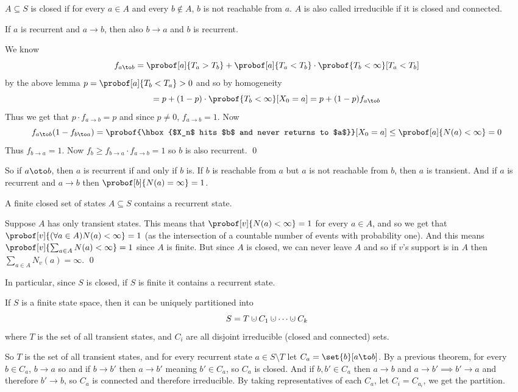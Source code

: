     $A\subseteq S$ is {\emphcolor closed} if for every $a\in A$ and every $b\notin A$, $b$ is not reachable from $a$.
    $A$ is also called {\emphcolor irreducible} if it is closed and connected.

\edefn

\bthrm

    If $a$ is recurrent and $a\to b$, then also $b\to a$ and $b$ is recurrent.

\ethrm

We know
$$ f_{a\to b} = \probof[a]{T_a>T_b} + \probof[a]{T_a<T_b}\cdot\probof{T_b<\infty}[T_a<T_b] $$
by the above lemma $p=\probof[a]{T_b<T_a}>0$ and so by homogeneity
$$ = p + (1-p)\cdot\probof{T_b<\infty}[X_0=a] = p + (1-p)f_{a\to b} $$
Thus we get that $p\cdot f_{a\to b}=p$ and since $p\neq0$, $f_{a\to b}=1$.
Now
$$ f_{a\to b}(1-f_{b\to a}) = \probof{\hbox{$X_n$ hits $b$ and never returns to $a$}}[X_0=a] \leq \probof[a]{N(a)<\infty} = 0 $$
Thus $f_{b\to a}=1$.
Now $f_b\geq f_{b\to a}\cdot f_{a\to b}=1$ so $b$ is also recurrent.
\qed

So if $a\oto b$, then $a$ is recurrent if and only if $b$ is.
If $b$ is reachable from $a$ but $a$ is not reachable from $b$, then $a$ is transient.
And if $a$ is recurrent and $a\to b$ then $\probof[b]{N(a)=\infty}=1$.

\bthrm

    A finite closed set of states $A\subseteq S$ contains a recurrent state.

\ethrm

Suppose $A$ has only transient states.
This means that $\probof[v]{N(a)<\infty}=1$ for every $a\in A$, and so we get that $\probof[v]{(\forall a\in A)N(a)<\infty}=1$ (as the intersection of a countable number of events with probability one).
And this means $\probof[v]{\sum_{a\in A}N(a)<\infty}=1$ since $A$ is finite.
But since $A$ is closed, we can never leave $A$ and so if $v$'s support is in $A$ then $\sum_{a\in A}N_v(a)=\infty$.
\qed

In particular, since $S$ is closed, if $S$ is finite it contains a recurrent state.

\bthrm

    If $S$ is a finite state space, then it can be uniquely partitioned into
    $$ S = T\dcup C_1\dcup\cdots\dcup C_k $$
    where $T$ is the set of all transient states, and $C_i$ are all disjoint irreducible (closed and connected) sets.

\ethrm

So $T$ is the set of all transient states, and for every recurrent state $a\in S\setminus T$ let $C_a=\set{b}[a\to b]$.
By a previous theorem, for every $b\in C_a$, $b\to a$ so and if $b\to b'$ then $a\to b'$ meaning $b'\in C_a$, so $C_a$ is closed.
And if $b,b'\in C_a$ then $a\to b$ and $a\to b'\implies b'\to a$ and therefore $b'\to b$, so $C_a$ is connected and therefore irreducible.
By taking representatives of each $C_a$, let $C_i=C_{a_i}$, we get the partition.


